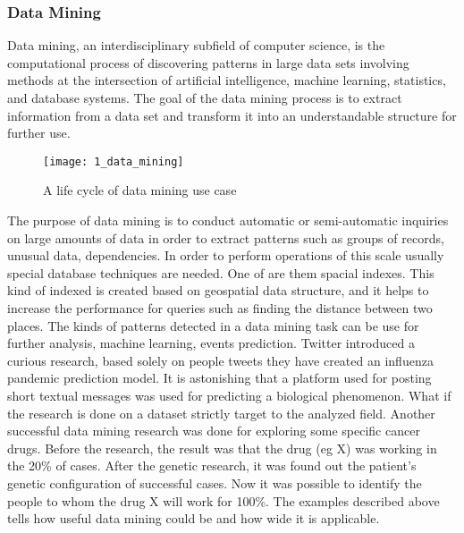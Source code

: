 \subsubsection{Data Mining}
Data mining, an interdisciplinary subfield of computer science, is the computational process of discovering patterns in large data sets involving methods at the intersection of artificial intelligence, machine learning, statistics, and database systems. The goal of the data mining process is to extract information from a data set and transform it into an understandable structure for further use.

\begin{figure}[!ht]
\centering
\texttt{[image: 1\_data\_mining]}
\caption{A life cycle of data mining use case}\label{data_mining}
\end{figure}

The purpose of data mining is to conduct automatic or semi-automatic inquiries on large amounts of data in order to extract patterns such as groups of records, unusual data, dependencies. In order to perform operations of this scale usually special database techniques are needed. One of are them spacial indexes. This kind of indexed is created based on geospatial data structure, and it helps to increase the performance for queries such as finding the distance between two places. The kinds of patterns detected in a data mining task can be use for further analysis, machine learning, events prediction. Twitter introduced a curious research, based solely on people tweets they have created an influenza pandemic prediction model. It is astonishing that a platform used for posting short textual messages was used for predicting a biological phenomenon. What if the research is done on a dataset strictly target to the analyzed field. Another successful data mining research was done for exploring some specific cancer drugs. Before the research, the result was that the drug (eg X) was working in the 20\% of cases. After the genetic research, it was found out the patient's genetic configuration of successful cases. Now it was possible to identify the people to whom the drug X will work for 100\%. The examples described above tells how useful data mining could be and how wide it is applicable.

